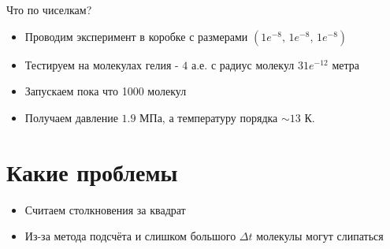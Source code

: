 \documentclass{beamer}
\begin{document}
\begin{frame}[fragile]
    Что по чиселкам? 

        \begin{itemize}
        \item<1-> Проводим эксперимент в коробке с размерами $(1e^{-8},\,1e^{-8},\,1e^{-8})$
        \item<2-> Тестируем на молекулах гелия - $4$ а.е. с радиус молекул $31e^{-12}$ метра 
        \item<3-> Запускаем пока что 1000 молекул
        \item<4-> Получаем давление $1.9$ МПа, а температуру порядка $\sim 13$ К.
    \end{itemize}
\end{frame}



\section{Какие проблемы}

\begin{frame}
  \begin{itemize}
    \item<1-> Считаем столкновения за квадрат
    \item<2-> Из-за метода подсчёта и слишком большого $\Delta t$ молекулы могут слипаться
  \end{itemize}
\end{frame}
\end{document}
